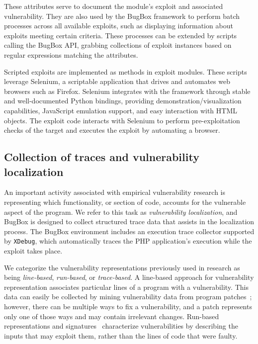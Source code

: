 \documentclass[letterpaper,twocolumn,10pt]{article}
\begin{document}
These attributes serve to document the module's exploit and associated vulnerability. They are also used by the BugBox framework to perform batch processes across all available exploits, such as displaying information about exploits meeting certain criteria. These processes can be extended by scripts calling the BugBox API, grabbing collections of exploit instances based on regular expressions matching the attributes.

Scripted exploits are implemented as methods in exploit modules. These scripts leverage Selenium, a scriptable application that drives and automates web browsers such as Firefox. Selenium integrates with the framework through stable and well-documented Python bindings, providing demonstration/visualization capabilities, JavaScript emulation support, and easy interaction with HTML objects. The exploit code interacts with Selenium to perform pre-exploitation checks of the target and executes the exploit by automating a browser.

\subsection{Collection of traces and vulnerability localization}

An important activity associated with empirical vulnerability research is representing which functionality, or section of code, accounts for the vulnerable aspect of the program. We refer to this task as \emph{vulnerability localization}, and BugBox is designed to collect structured trace data that assists in the localization process. The BugBox environment includes an execution trace collector supported by \texttt{XDebug}, which automatically traces the PHP application's execution while the exploit takes place.

We categorize the vulnerability representations previously used in research as being \textit{line-based}, \textit{run-based}, or \textit{trace-based}. A line-based approach for vulnerability representation associates particular lines of a program with a vulnerability. This data can easily be collected by mining vulnerability data from program patches~\cite{4630094}; however, there can be multiple ways to fix a vulnerability, and a patch represents only one of those ways and may contain irrelevant changes.  Run-based representations and signatures~\cite{Song:2008:BNA:1496255.1496257} characterize vulnerabilities by describing the inputs that may exploit them, rather than the lines of code that were faulty.
\end{document}
